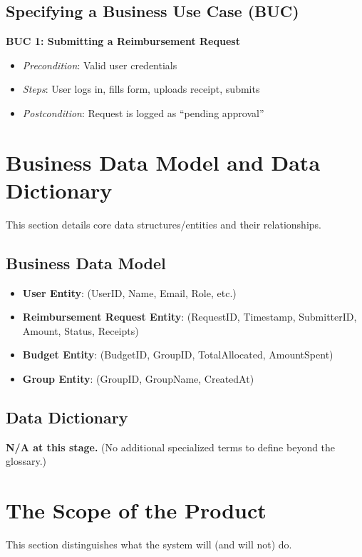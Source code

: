 \documentclass[12pt]{article}
\begin{document}
\subsection{Specifying a Business Use Case (BUC)}
\textbf{BUC 1: Submitting a Reimbursement Request}
\begin{itemize}
  \item \textit{Precondition}: Valid user credentials
  \item \textit{Steps}: User logs in, fills form, uploads receipt, submits
  \item \textit{Postcondition}: Request is logged as “pending approval”
\end{itemize}

\section{Business Data Model and Data Dictionary}
This section details core data structures/entities and their relationships.

\subsection{Business Data Model}
\begin{itemize}
  \item \textbf{User Entity}: (UserID, Name, Email, Role, etc.)
  \item \textbf{Reimbursement Request Entity}: (RequestID, Timestamp, SubmitterID, Amount, Status, Receipts)
  \item \textbf{Budget Entity}: (BudgetID, GroupID, TotalAllocated, AmountSpent)
  \item \textbf{Group Entity}: (GroupID, GroupName, CreatedAt)
\end{itemize}

\subsection{Data Dictionary}
\textbf{N/A at this stage.} (No additional specialized terms to define beyond the glossary.)

\section{The Scope of the Product}
This section distinguishes what the system will (and will not) do.
\end{document}

